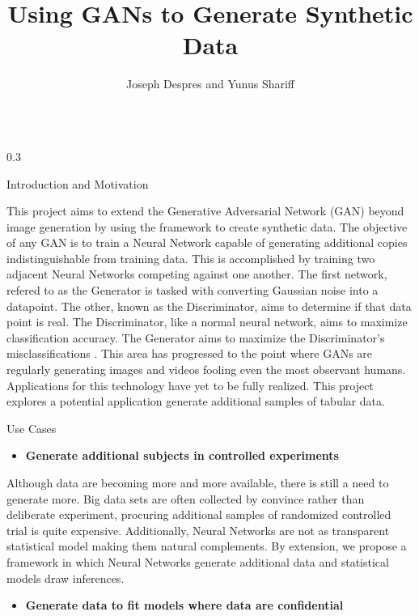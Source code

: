 \documentclass{msuposter}
\title{Using GANs to Generate Synthetic Data}
\author{Joseph Despres and Yunus Shariff}
\institute{Michigan State University}
\newcommand{\colwidth}{0.3\linewidth}
\begin{document}
\begin{frame}{}
\begin{columns}[t]

\begin{column}{\colwidth}

\begin{block}{Introduction and Motivation}

This project aims to extend the Generative Adversarial Network (GAN) beyond image generation by using the framework to create synthetic data. The objective of any GAN is to train a Neural Network capable of generating additional copies indistinguishable from training data. This is accomplished by training two adjacent Neural Networks competing against one another. The first network, refered to as the Generator is tasked with converting Gaussian noise into a datapoint. The other, known as the Discriminator, aims to determine if that data point is real. The Discriminator, like a normal neural network, aims to maximize classification accuracy. The Generator aims to maximize the Discriminator's misclassifications \cite{NIPS2014_5ca3e9b1}. This area has progressed to the point where GANs are regularly generating images and videos fooling even the most observant humans. Applications for this technology have yet to be fully realized. This project explores a potential application generate additional samples of tabular data.

\end{block}

\begin{block}{Use Cases}

\begin{itemize}
	\item \textbf{Generate additional subjects in controlled experiments}
\end{itemize}

Although data are becoming more and more available, there is still a need to generate more. Big data sets are often collected by convince rather than deliberate experiment, procuring additional samples of randomized controlled trial is quite expensive. Additionally, Neural Networks are not as transparent statistical model making them natural complements. By extension, we propose a framework in which Neural Networks generate additional data and statistical models draw inferences. 

\begin{itemize}
	\item \textbf{Generate data to fit models where data are confidential}
\end{itemize}


\end{block}
\end{column}
\end{columns}
\end{frame}
\end{document}
